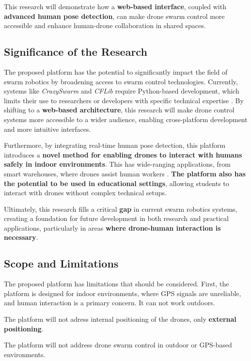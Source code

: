 This research will demonstrate how a \textbf{web-based interface}, coupled with \textbf{advanced human pose detection}, can make drone swarm control more accessible and enhance human-drone collaboration in shared spaces.

\subsection{Significance of the Research}

The proposed platform has the potential to significantly impact the field of swarm robotics by broadening access to swarm control technologies. Currently, systems like \textit{CrazySwarm} and \textit{CFLib} require Python-based development, which limits their use to researchers or developers with specific technical expertise \cite{crazyflie,bitcraze_cflib}. By shifting to a \textbf{web-based architecture}, this research will make drone control systems more accessible to a wider audience, enabling cross-platform development and more intuitive interfaces.

Furthermore, by integrating real-time human pose detection, this platform introduces a \textbf{novel method for enabling drones to interact with humans safely in indoor environments}. This has wide-ranging applications, from smart warehouses, where drones assist human workers \cite{flyjacket, human_drone_interaction}. \textbf{The platform also has the potential to be used in educational settings}, allowing students to interact with drones without complex technical setups.

Ultimately, this research fills a critical \textbf{gap} in current swarm robotics systems, creating a foundation for future development in both research and practical applications, particularly in areas \textbf{where drone-human interaction is necessary}.

\subsection{Scope and Limitations}

The proposed platform has limitations that should be considered. First, the platform is designed for indoor environments, where GPS signals are unreliable, and human interaction is a primary concern. It can not work outdoors.

The platform will not adress internal positioning of the drones, only \textbf{external positioning}.

The platform will not address drone swarm control in outdoor or GPS-based environments.

